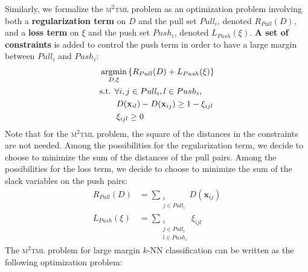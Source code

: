 Similarly, we formalize the \textsc{m$^2$tml} problem as an optimization problem involving both a \textbf{regularization term} on $D$ and the pull set $Pull_i$, denoted $R_{Pull}(D)$, and a \textbf{loss term} on $\xi$ and the push set $Push_i$, denoted $L_{Push}(\xi)$. \textbf{A set of constraints} is added to control the push term in order to have a large margin between $Pull_i$ and $Push_i$:
\begin{equation}
\begin{aligned}
\displaystyle 	& \argmin_{D,\xi} \left\lbrace R_{Pull}(D) + L_{Push}(\xi) \right\rbrace  \\
& \text{s.t. } 	\forall i, j \in Pull_i, l \in Push_i, \\
				& \qquad D(\textbf{x}_{il})-D(\textbf{x}_{ij}) \geq 1 - \xi_{ijl} \\
				& \qquad \xi_{ijl} \geq 0 
\end{aligned}
\end{equation}
\noindent Note that for the \textsc{m$^2$tml} problem, the square of the distances in the constraints are not needed. Among the possibilities for the regularization term, we decide to choose to minimize the sum of the distances of the pull pairs. Among the possibilities for the loss term, we decide to choose to minimize the sum of the slack variables on the push pairs: 
\begin{align}
	R_{Pull}(D) 	& = \sum_{\substack{i \\ j \in Pull_i}}D(\textbf{x}_{ij}) \\
	L_{Push}(\xi) 	& = \sum\limits_{\substack{i \\ j \in Pull_i \\ l \in Push_i}} \xi_{ijl}
\end{align}
The \textsc{m$^2$tml} problem for large margin $k$-NN classification can be written as the following optimization problem:
